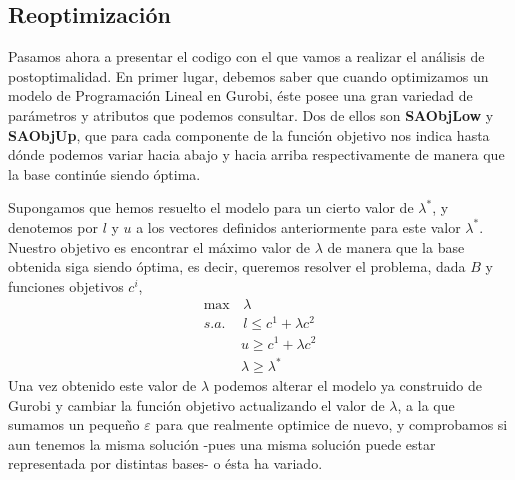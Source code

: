 \documentclass[twoside,a4paper,openright,12pt]{book}
\begin{document}
\subsection{Reoptimización}
Pasamos ahora a presentar el codigo con el que vamos a realizar el análisis de postoptimalidad. En primer lugar, debemos saber que cuando optimizamos un modelo de Programación Lineal en Gurobi, éste posee una gran variedad de parámetros y atributos que podemos consultar. Dos de ellos son \textbf{SAObjLow }y \textbf{SAObjUp}, que para cada componente de la función objetivo nos indica hasta dónde podemos variar hacia abajo y hacia arriba respectivamente de manera que la base continúe siendo óptima. 

 Supongamos que hemos resuelto el modelo para un cierto valor de $\lambda^*$, y denotemos por $l$ y $u$ a los vectores definidos anteriormente para este valor $\lambda^*$. Nuestro objetivo es encontrar el máximo valor de $\lambda$ de manera que la base obtenida siga siendo óptima, es decir, queremos resolver el problema, dada $B$ y funciones objetivos $c^i$, 
\begin{align*}
\max&\, \lambda\\
s.a.&\,  l \leq c^1 + \lambda c^2\\
& u \geq c^1 + \lambda c^2 \\
& \lambda\geq \lambda^* 
\end{align*}
Una vez obtenido este valor de $\lambda$ podemos alterar el modelo ya construido de Gurobi y cambiar la función objetivo actualizando el valor de $\lambda$, a la que sumamos un pequeño $\varepsilon$ para que realmente optimice de nuevo, y comprobamos si aun tenemos la misma solución -pues una misma solución puede estar representada por distintas bases- o ésta ha variado. 
\end{document}
